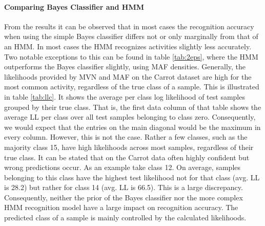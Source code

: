 \documentclass[11pt,titlepage,oneside,openany]{book}
\begin{document}
\paragraph{Comparing Bayes Classifier and HMM}
From the results it can be observed that in most cases the recognition accuracy when using the simple Bayes classifier differs not or only marginally from that of an HMM. In most cases the HMM recognizes activities slightly less accurately. Two notable exceptions to this can be found in table \ref{tab:2eps}, where the HMM outperforms the Bayes classifier slightly, using MAF densities. Generally, the likelihoods provided by MVN and MAF on the Carrot dataset are high for the most common activity, regardless of the true class of a sample. This is illustrated in table \ref{tab:llc}. It shows the average per class log likelihood of test samples grouped by their true class. That is, the first data column of that table shows the average LL per class over all test samples belonging to class zero. Consequently, we would expect that the entries on the main diagonal would be the maximum in every column. However, this is not the case. Rather a few classes, such as the majority class 15, have high likelihoods across most samples, regardless of their true class. It can be stated that on the Carrot data often highly confident but wrong predictions occur. As an example take class 12. On average, samples belonging to this class have the highest test likelihood not for that class (avg. LL is 28.2) but rather for class 14 (avg. LL is 66.5). This is a large discrepancy. Consequently, neither the prior of the Bayes classifier nor the more complex HMM recognition model have a large impact on recognition accuracy. The predicted class of a sample is mainly controlled by the calculated likelihoods. 
\end{document}
